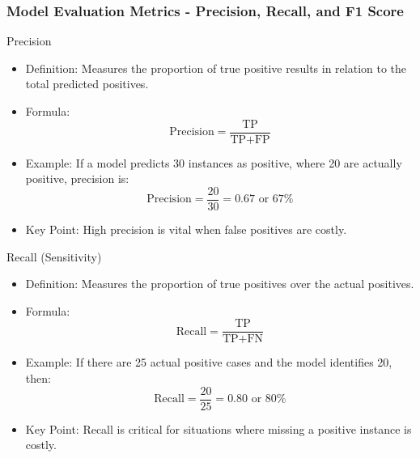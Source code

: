 \documentclass[aspectratio=169]{beamer}
\begin{document}
\begin{frame}[fragile]
    \frametitle{Model Evaluation Metrics - Precision, Recall, and F1 Score}
    \begin{block}{Precision}
        \begin{itemize}
            \item Definition: Measures the proportion of true positive results in relation to the total predicted positives.
            \item Formula: 
            \begin{equation}
            \text{Precision} = \frac{\text{TP}}{\text{TP} + \text{FP}}
            \end{equation}
            \item Example: If a model predicts 30 instances as positive, where 20 are actually positive, precision is:
            \begin{equation}
            \text{Precision} = \frac{20}{30} = 0.67 \text{ or } 67\%
            \end{equation}
            \item Key Point: High precision is vital when false positives are costly.
        \end{itemize}
    \end{block}

    \begin{block}{Recall (Sensitivity)}
        \begin{itemize}
            \item Definition: Measures the proportion of true positives over the actual positives.
            \item Formula: 
            \begin{equation}
            \text{Recall} = \frac{\text{TP}}{\text{TP} + \text{FN}}
            \end{equation}
            \item Example: If there are 25 actual positive cases and the model identifies 20, then:
            \begin{equation}
            \text{Recall} = \frac{20}{25} = 0.80 \text{ or } 80\%
            \end{equation}
            \item Key Point: Recall is critical for situations where missing a positive instance is costly.
        \end{itemize}
    \end{block}


\end{frame}
\end{document}
